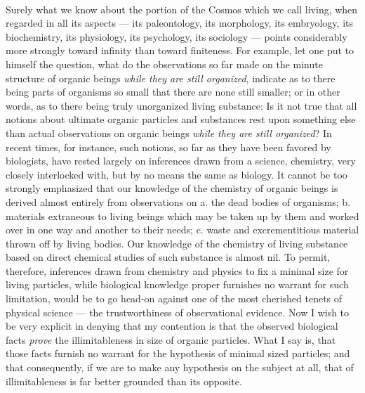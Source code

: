 \documentclass[a4paper, 11pt, oneside, polutonikogreek, english, landscape]{article}
\begin{document}
\paragraph{}
Surely what we know about the portion of the Cosmos which we call living, when regarded in all its aspects --- its paleontology, its morphology, its embryology, its biochemistry, its physiology, its psychology, its sociology --- points considerably more strongly toward infinity than toward finiteness. For example, let one put to himself the question, what do the observations so far made on the minute structure of organic beings \emph{while they are still organized}, indicate as to there being parts of organisms so small that there are none still smaller; or in other words, as to there being truly unorganized living substance: Is it not true that all notions about ultimate organic particles and substances rest upon something else than actual observations on organic beings \emph{while they are still organized}? In recent times, for instance, such notions, so far as they have been favored by biologists, have rested largely on inferences drawn from a science, chemistry, very closely interlocked with, but by no means the same as biology. It cannot be too strongly emphasized that our knowledge of the chemistry of organic beings is derived almost entirely from observations on a. the dead bodies of organisms; b. materials extraneous to living beings which may be taken up by them and worked over in one way and another to their needs; c. waste and excrementitious material thrown off by living bodies. Our knowledge of the chemistry of living substance based on direct chemical studies of such substance is almost nil. To permit, therefore, inferences drawn from chemistry and physics to fix a minimal size for living particles, while biological knowledge proper furnishes no warrant for such limitation, would be to go head-on against one of the most cherished tenets of physical science --- the trustworthiness of observational evidence. Now I wish to be very explicit in denying that my contention is that the observed biological facts \emph{prove} the illimitableness in size of organic particles. What I say is, that those facts furnish no warrant for the hypothesis of minimal sized particles; and that consequently, if we are to make any hypothesis on the subject at all, that of illimitableness is far better grounded than its opposite.
\end{document}
